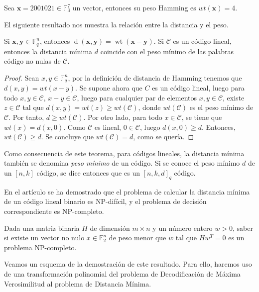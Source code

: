 \begin{exampleth}
    Sea $\mathbf{x} = 2001021 \in \mathbb{F}_3^7$ un vector, entonces su peso Hamming es $wt(\mathbf{x}) = 4$.
\end{exampleth}

El siguiente resultado nos muestra la relación entre la distancia y el peso.

\begin{theorem}
    Si $\mathbf{x}, \mathbf{y} \in \mathbb{F}_q^n$, entonces $\operatorname{d}(\mathbf{x},\mathbf{y}) = \operatorname{wt}(\mathbf{x}-\mathbf{y})$. Si $\mathcal{C}$ es un código lineal, entonces la distancia mínima $d$ coincide con el peso mínimo de las palabras código no nulas de $\mathcal{C}$.
\end{theorem}

\begin{proof}
    Sean $x,y \in \mathbb{F}_q^n$, por la definición de distancia de Hamming tenemos que $d(x,y) = wt(x-y)$. Se supone ahora que $C$ es un código lineal, luego para todo $x,y \in \mathcal{C}$, $x-y \in \mathcal{C}$, luego para cualquier par de elementos $x,y \in \mathcal{C}$, existe $z \in \mathcal{C}$ tal que $d(x,y) = wt(z) \geq wt(\mathcal{C})$, donde $wt(\mathcal{C})$ es el peso mínimo de $\mathcal{C}$. Por tanto, $d \geq wt(\mathcal{C})$. Por otro lado, para todo $x \in \mathcal{C}$, se tiene que $wt(x) = d(x,0)$. Como $\mathcal{C}$ es lineal, $0 \in \mathcal{C}$, luego $d(x,0) \geq d$. Entonces, $wt(\mathcal{C}) \geq d$. Se concluye que $wt(\mathcal{C}) = d$, como se quería.
\end{proof}

Como consecuencia de este teorema, para códigos lineales, la distancia mínima también se denomina \emph{peso mínimo} de un código. Si se conoce el peso mínimo $d$ de un $[n,k]$ código, se dice entonces que es un $[n,k,d]_q$ código.

En el artículo \cite{Vardy_1997} se ha demostrado que el problema de calcular la distancia mínima de un código lineal binario es NP-difícil, y el problema de decisión correspondiente es NP-completo.

\begin{theorem}
    Dada una matriz binaria $H$ de dimensión $m \times n$ y un número entero $w > 0$, saber si existe un vector no nulo $x \in \mathbb{F}_2^n$ de peso menor que $w$ tal que $Hw^T = 0$ es un problema NP-completo. 
\end{theorem}

Veamos un esquema de la demostración de este resultado. Para ello, haremos uso de una transformación polinomial del problema de Decodificación de Máxima Verosimilitud al problema de Distancia Mínima.

